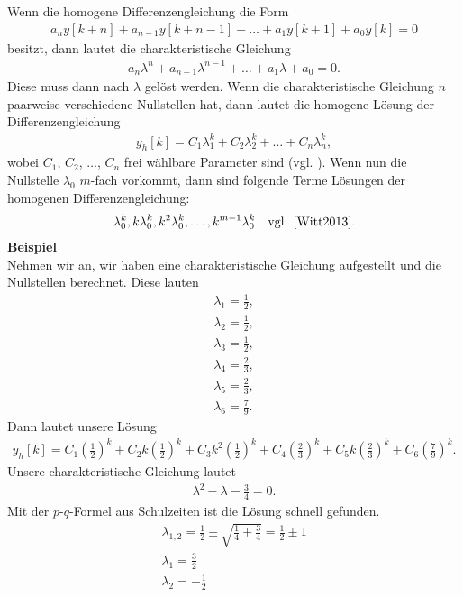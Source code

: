 \documentclass[11pt,a4paper,DIV=12]{scrartcl}
\begin{document}
Wenn die homogene Differenzengleichung die Form
\begin{gather}
	a_ny[k+n]+a_{n-1}y[k+n-1]+\dots+a_1y[k+1]+a_0y[k]=0
\end{gather}
besitzt, dann lautet die charakteristische Gleichung
\begin{gather}
	a_n\lambda^n+a_{n-1}\lambda^{n-1}+\dots+a_1\lambda+a_0=0.
\end{gather}
Diese muss dann nach $\lambda$ gelöst werden. Wenn die charakteristische Gleichung $n$ paarweise verschiedene Nullstellen hat, dann lautet die homogene Lösung der Differenzengleichung
\begin{gather}
	y_h[k]=C_1\lambda_1^k+C_2\lambda_2^k+\dots+C_n\lambda_n^k,
\end{gather}
wobei $C_1$, $C_2$, $\dots$, $C_n$ frei wählbare Parameter sind (vgl. \cite[Kap. 5, S. 85]{Witt2013}).
Wenn nun die Nullstelle $\lambda_0$ $m$-fach vorkommt, dann sind folgende Terme Lösungen der homogenen Differenzengleichung:
\begin{gather}
	\lambda_0^k,k\lambda_0^k,k^2\lambda_0^k,\dots,k^{m-1}\lambda_0^k\quad\text{vgl. \cite[Kap. 5, S. 91]{Witt2013}}.
\end{gather}
\textbf{Beispiel}\\
Nehmen wir an, wir haben eine charakteristische Gleichung aufgestellt und die Nullstellen berechnet. Diese lauten
\begin{gather}
	\lambda_1 = \frac{1}{2},\nonumber\\
	\lambda_2 = \frac{1}{2},\nonumber\\
	\lambda_3 = \frac{1}{2},\nonumber\\
	\lambda_4 = \frac{2}{3},\nonumber\\
	\lambda_5 = \frac{2}{3},\nonumber\\
	\lambda_6 = \frac{7}{9}.\nonumber
\end{gather}
Dann lautet unsere Lösung
\begin{gather}
	y_h[k]=C_1\left(\frac{1}{2}\right)^k+C_2k\left(\frac{1}{2}\right)^k+C_3k^2\left(\frac{1}{2}\right)^k+C_4\left(\frac{2}{3}\right)^k+C_5k\left(\frac{2}{3}\right)^k+C_6\left(\frac{7}{9}\right)^k.
\end{gather}
Unsere charakteristische Gleichung lautet
\begin{gather}
	\lambda^2-\lambda-\frac{3}{4}=0.
\end{gather}
Mit der $p$-$q$-Formel aus Schulzeiten ist die Lösung schnell gefunden.
\begin{gather}
	\lambda_{1,2}=\frac{1}{2}\pm \sqrt{\frac{1}{4}+\frac{3}{4}}=\frac{1}{2}\pm 1\\
	\lambda_1=\frac{3}{2}\\
	\lambda_2=-\frac{1}{2}
\end{gather}
\end{document}
